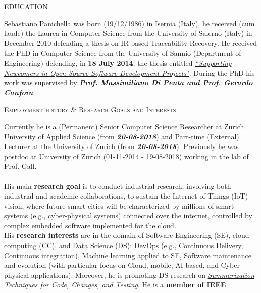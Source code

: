 \documentclass[12pt]{article}
\begin{document}
\vspace{2.5mm}
\textsc{EDUCATION}
\vspace{1.5mm}

Sebastiano Panichella was born (19/12/1986) 
in Isernia (Italy), he received (cum laude) the Laurea in Computer Science from the University of Salerno (Italy) in December 2010 defending a thesis on IR-based Traceability Recovery. 
He received the PhD in Computer Science from the University of Sannio (Department of Engineering) defending, in  \textbf{18 July 2014},  the thesis entitled  \href{http://dx.doi.org/10.1109/ICSM.2015.7332519}{\textit{``Supporting Newcomers in Open Source Software Development Projects"}}.  During the PhD his work was supervised by \textbf{\textit{Prof. Massimiliano Di Penta and Prof. Gerardo Canfora}}.

\vspace{2.5mm}
\textsc{Employment history \& Research Goals and Interests}
\vspace{1.5mm}


Currently he is a (Permanent) Senior Computer Science Researcher at Zurich University of Applied Science (from \textit{\textbf{20-08-2018}}) and Part-time (External) Lecturer at the University of Zurich (from \textit{\textbf{20-08-2018}}). Previously he was postdoc at University of Zurich (01-11-2014 - 19-08-2018) working in the lab of Prof. Gall. \\\\
His main \textbf{research goal} is to conduct industrial research, involving both industrial and academic collaborations, to sustain
the Internet of Things (IoT) vision, where future smart cities will be characterized by millions of smart systems (e.g., cyber-physical
systems) connected over the internet, controlled by complex embedded software implemented for the cloud.\\
His  \textbf{research interests} are in the domain of Software Engineering (SE), cloud computing (CC), and Data Science (DS): DevOps (e.g., Continuous Delivery, Continuous integration), Machine learning applied to SE, Software maintenance and evolution (with particular focus on Cloud, mobile, AI-based, and Cyber-physical applications). Moreover, he is promoting DS research on \href{https://doi.org/10.1109/VST.2018.8327148}{\textit{Summarization Techniques for Code, Changes, and Testing}}. He is a \textbf{member of IEEE}. 
\vspace{1mm}
\end{document}
